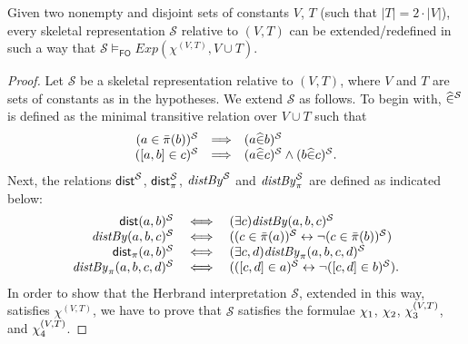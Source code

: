 \documentclass[a4paper]{llncs}
\newcommand{\HExp}{Exp}
\newcommand{\pair}[2]{[#1,#2]}
\newcommand{\pairin}[3]{\left[#1,#2\right] \in #3}
\newcommand{\nonpairin}[2]{#1 \in \bar{\pi}(#2)}
\newcommand{\seteq}[2]{#1=#2}
\newcommand{\atset}{\mathcal{S}}
\newcommand{\consta}{a}
\newcommand{\constb}{b}
\newcommand{\constc}{c}
\newcommand{\constd}{d}
\newcommand{\hinter}{\ensuremath{\mathcal{H}}}
\newcommand{\fomodels}[2]{#1 \models_{\mathsf{FO}} #2}
\begin{document}
\begin{lemma}\label{SKTOHER}
Given two nonempty and disjoint sets of constants $V$, $T$ (such that 
$|T| = 2 \cdot |V|$), every skeletal representation $\atset$ relative 
to $(V,T)$
can be extended/redefined in such a way that $ 
\fomodels{\atset}{\HExp(\chi^{(V,T)}, V \cup T)}$.
\end{lemma}
\begin{proof}
Let $\atset$ be a skeletal representation relative to $(V,T)$, where
$V$ and $T$ are sets of constants as in the hypotheses. We extend 
$\atset$ as follows.
%
%
To begin with, $\memhatP{}^{\atset}$ is defined as the minimal 
transitive relation over $V \cup T$
such that
\[
\begin{array}{rcl}
  (\nonpairin{\consta}{\constb})^{\atset} & \Longrightarrow & 
(\memhat{\consta}{\constb})^{\atset} \\
  (\pairin{\consta}{\constb}{\constc})^{\atset} & \Longrightarrow & 
(\memhat{\consta}{\constc})^{\atset} \wedge 
(\memhat{\constb}{\constc})^{\atset}.
\end{array}
\]
Next, the relations $\distS^{\atset}$, $\distPS^{\atset}$, 
$\distbyS^{\atset}$ and $\distPbyS^{\atset}$ are defined
as indicated below:
\[
\begin{array}{rcl}
   \dist{\consta}{\constb}^{\atset} & \iff & (\exists 
\constc)\distby{\consta}{\constb}{\constc}^{\atset}\\
   \distby{\consta}{\constb}{\constc}^{\atset} & \iff & 
((\nonpairin{\constc}{\consta})^{\atset} \leftrightarrow \neg 
(\nonpairin{\constc}{\constb})^{\atset}) \\
   \distP{\consta}{\constb}^{\atset} & \iff & (\exists \constc, 
\constd)\distPby{\consta}{\constb}{\constc}{\constd}^{\atset} \\
   \distPby{\consta}{\constb}{\constc}{\constd}^{\atset} & \iff & 
((\pairin{\constc}{\constd}{\consta})^{\atset} \leftrightarrow \neg 
(\pairin{\constc}{\constd}{\constb})^{\atset}) .
\end{array}
\]
%
%
In order to show that the Herbrand interpretation $\atset$, extended
in this way, satisfies $\chi^{(V,T)}$, we have to prove that $\atset$
satisfies the formulae $\chi_1$, $\chi_2$, $\chi_3^{(V,T)}$, and
$\chi_4^{(V,T)}$.


\end{proof}
\end{document}
